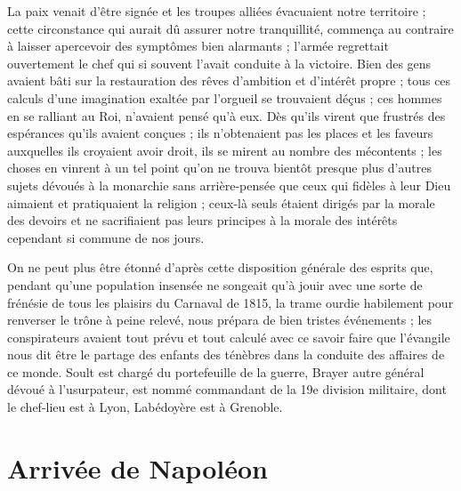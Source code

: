 \documentclass[11pt,a4paper]{report}
\begin{document}
La paix venait d'être signée et les troupes alliées évacuaient notre territoire ; cette circonstance qui aurait dû assurer notre tranquillité, commença au contraire à laisser apercevoir des symptômes bien alarmants ; l'armée regrettait ouvertement le chef qui si souvent l'avait conduite à la victoire. Bien des gens avaient bâti sur la restauration des rêves d'ambition et d'intérêt propre ; tous ces calculs d'une imagination exaltée par l'orgueil se trouvaient déçus ; ces hommes en se ralliant au Roi, n'avaient pensé qu'à eux. Dès qu'ils virent que frustrés des espérances qu'ils avaient conçues ; ils n'obtenaient pas les places et les faveurs auxquelles ils croyaient avoir droit, ils se mirent au nombre des mécontents ; les choses en vinrent à un tel point qu'on ne trouva bientôt presque plus d'autres sujets dévoués à la monarchie sans arrière-pensée que ceux qui fidèles à leur Dieu aimaient et pratiquaient la religion ; ceux-là seuls étaient dirigés par la morale des devoirs et ne sacrifiaient pas leurs principes à la morale des intérêts cependant si commune de nos jours.

On ne peut plus être étonné d'après cette disposition générale des esprits que, pendant qu'une population insensée ne songeait qu'à jouir avec une sorte de frénésie de tous les plaisirs du Carnaval de 1815, la trame ourdie habilement pour renverser le trône à peine relevé, nous prépara de bien tristes événements ; les conspirateurs avaient tout prévu et tout calculé avec ce savoir faire que l'évangile nous dit être le partage des enfants des ténèbres dans la conduite des affaires de ce monde. Soult est chargé du portefeuille de la guerre, Brayer autre général dévoué à l'usurpateur, est nommé commandant de la 19e division militaire, dont le chef-lieu est à Lyon, Labédoyère est à Grenoble.

\section*{Arrivée de Napoléon}
\end{document}
